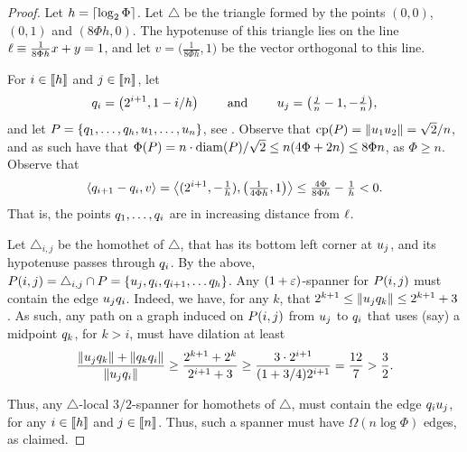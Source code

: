\documentclass[12pt]{article}%
\begin{document}
\begin{proof}
    Let $h = \left\lceil {\log_2 \Phi} \right\rceil$.  Let $\triangle$ be the triangle
    formed by the points $(0,0)$, $(0,1)$ and $(8\Phi h,0)$.  The
    hypotenuse of this triangle lies on the line
    $\ell \equiv \frac{1}{8\Phi h}x + y = 1$, and let
    $v = \bigl(\frac{1}{8\Phi h}, 1\bigr)$ be the vector orthogonal to
    this line.
    
    For $i \in \IRX{h}$ and $j \in \IRX{n}$, let
    \begin{align*}
      q_i = \bigl(2^{i+1}, 1 - i/h \bigr)
      \qquad \text{ and }\qquad
      u_j = \bigl(\tfrac{j}{n}-1, -\tfrac{j}{n} \bigr),
    \end{align*}
    and let $P = \{ q_1, \ldots, q_h, u_1, \ldots, u_n\}$,
    see .  Observe that
    $\cpX{\PS} = \dY{\pc_1}{\pc_2} = \sqrt{2}/n$, and as such have
    that
    $\spreadX{\PS} = n \cdot \diamX{\PS}/\sqrt{2} \leq n(4\Phi + 2n)
    \leq 8 \Phi n$, as $\Phi \geq n$.  Observe that
    \begin{equation*}
        \DotProd{\pb_{i+1} - \pb_i}{v}%
        =%
        \DotProd{(2^{i+1},-\tfrac{1}{h})}{ \bigl(\tfrac{1}{4\Phi h},
           1\bigr)}
        \leq
        \tfrac{4\Phi}{8\Phi h} - \tfrac{1}{h} < 0.
    \end{equation*}
    That is, the points $q_1, \ldots, q_i$ are in increasing
    distance from $\ell$.

    Let $\triangle_{i,j}$ be the homothet of $\triangle$, that has its
    bottom left corner at $u_j$, and its hypotenuse passes through
    $q_i$. By the above,
    $P(i,j) = \triangle_{i,j} \cap P = \{ u_j, q_i, q_{i+1},
    \ldots q_h \}$.  Any $(1+\varepsilon)$-spanner for $P(i,j)$ must
    contain the edge $u_j q_i$. Indeed, we have, for any $k$, that
    $2^{k+1} \leq \left\| u_j q_{k} \right\| \leq 2^{k+1} +3$. As such, any
    path on a graph induced on $P(i,j)$ from $u_j$ to $q_i$ that
    uses (say) a midpoint $q_k$, for $k >i$, must have dilation at
    least
    \begin{equation*}
        \frac{\dY{\pc_j}{\pb_k} +
           \dY{\pb_k}{\pb_i}}{\dY{\pc_j}{\pb_{i}}}
        \geq%
        \frac{2^{k+1} + 2^{k} }{2^{i+1} + 3}
        \geq%
        \frac{3 \cdot 2^{i+1} }{(1+3/4) 2^{i+1} }
        =
        \frac{12}{7}
        >
        \frac{3}{2}.
    \end{equation*}

    Thus, any $\triangle$-local $3/2$-spanner for homothets of
    $\triangle$, must contain the edge $q_i u_j$, for any
    $i \in \IRX{h}$ and $j \in \IRX{n}$. Thus, such a spanner must
    have $ \Omega( n \log \Phi)$ edges, as claimed.
\end{proof}
\end{document}
